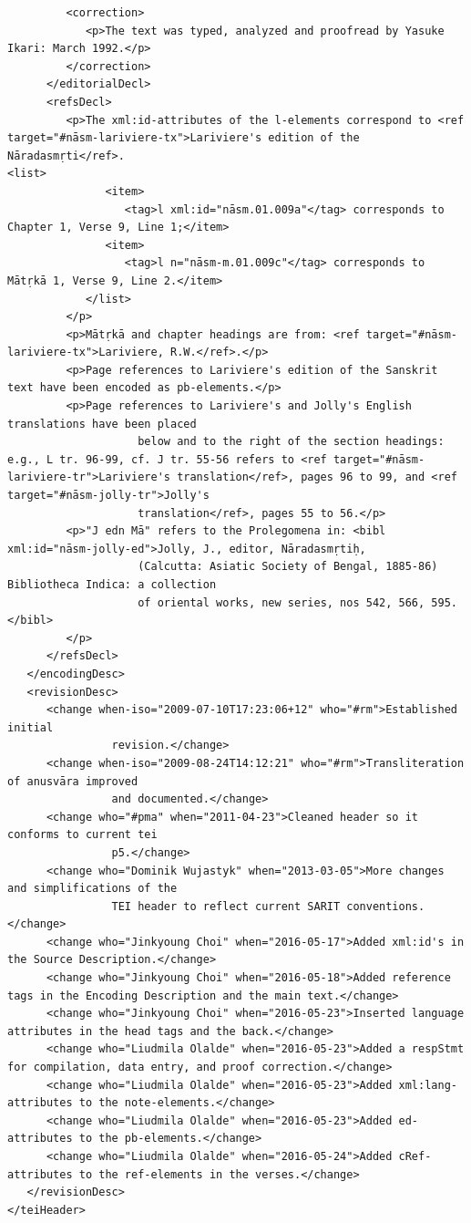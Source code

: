 \documentclass[article,12pt,a4paper]{memoir}%
\begin{document}
\begin{verbatim}
         <correction>
            <p>The text was typed, analyzed and proofread by Yasuke Ikari: March 1992.</p>
         </correction>
      </editorialDecl>
      <refsDecl>
         <p>The xml:id-attributes of the l-elements correspond to <ref target="#nāsm-lariviere-tx">Lariviere's edition of the Nāradasmṛti</ref>.
<list>
               <item>
                  <tag>l xml:id="nāsm.01.009a"</tag> corresponds to Chapter 1, Verse 9, Line 1;</item>
               <item>
                  <tag>l n="nāsm-m.01.009c"</tag> corresponds to Mātṛkā 1, Verse 9, Line 2.</item>
            </list>
         </p>
         <p>Mātṛkā and chapter headings are from: <ref target="#nāsm-lariviere-tx">Lariviere, R.W.</ref>.</p>
         <p>Page references to Lariviere's edition of the Sanskrit text have been encoded as pb-elements.</p>
         <p>Page references to Lariviere's and Jolly's English translations have been placed
                    below and to the right of the section headings: e.g., L tr. 96-99, cf. J tr. 55-56 refers to <ref target="#nāsm-lariviere-tr">Lariviere's translation</ref>, pages 96 to 99, and <ref target="#nāsm-jolly-tr">Jolly's
                    translation</ref>, pages 55 to 56.</p>
         <p>"J edn Mā" refers to the Prolegomena in: <bibl xml:id="nāsm-jolly-ed">Jolly, J., editor, Nāradasmṛtiḥ,
                    (Calcutta: Asiatic Society of Bengal, 1885-86) Bibliotheca Indica: a collection
                    of oriental works, new series, nos 542, 566, 595.</bibl>
         </p>
      </refsDecl>
   </encodingDesc>
   <revisionDesc>
      <change when-iso="2009-07-10T17:23:06+12" who="#rm">Established initial
                revision.</change>
      <change when-iso="2009-08-24T14:12:21" who="#rm">Transliteration of anusvāra improved
                and documented.</change>
      <change who="#pma" when="2011-04-23">Cleaned header so it conforms to current tei
                p5.</change>
      <change who="Dominik Wujastyk" when="2013-03-05">More changes and simplifications of the
                TEI header to reflect current SARIT conventions.</change>
      <change who="Jinkyoung Choi" when="2016-05-17">Added xml:id's in the Source Description.</change>
      <change who="Jinkyoung Choi" when="2016-05-18">Added reference tags in the Encoding Description and the main text.</change>
      <change who="Jinkyoung Choi" when="2016-05-23">Inserted language attributes in the head tags and the back.</change>
      <change who="Liudmila Olalde" when="2016-05-23">Added a respStmt for compilation, data entry, and proof correction.</change>
      <change who="Liudmila Olalde" when="2016-05-23">Added xml:lang-attributes to the note-elements.</change>
      <change who="Liudmila Olalde" when="2016-05-23">Added ed-attributes to the pb-elements.</change>
      <change who="Liudmila Olalde" when="2016-05-24">Added cRef-attributes to the ref-elements in the verses.</change>
   </revisionDesc>
</teiHeader>
	 \end{verbatim}
       
      \clearpage
      \begin{english}
      \printshorthands
      \printbibliography
      \end{english}
    
\end{document}
